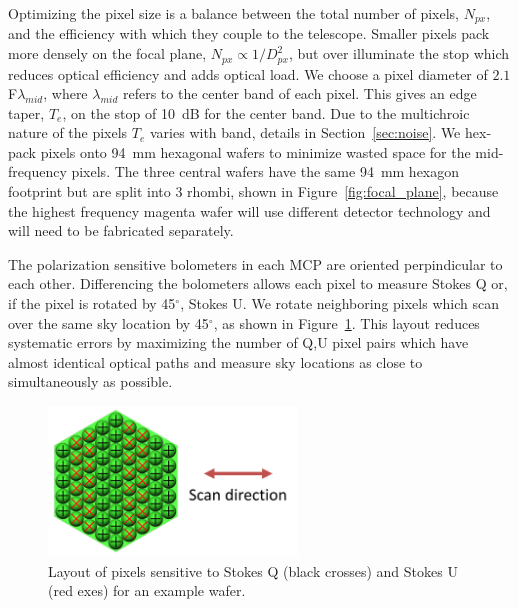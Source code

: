 \documentclass[]{spie}  %
\newcommand{\comr}[1]{\textcolor{red}{#1}}
\newcommand{\dgr}{$^\circ$}
\begin{document}
Optimizing the pixel size is a balance between the total number of pixels, $N_{px}$, and the efficiency with which they couple to the telescope. 
Smaller pixels pack more densely on the focal plane, $N_{px}\propto 1/D_{px}^2$, but over illuminate the stop which reduces optical efficiency 
and adds optical load.  
We choose a pixel diameter of $2.1$F$\lambda_{mid}$, where $\lambda_{mid}$ refers to the center 
band of each pixel. This gives an edge taper, $T_e$, on the stop of 10~dB for the center band. 
Due to the multichroic nature of the pixels $T_e$ varies with band, details in Section~\ref{sec:noise}. 
We hex-pack pixels onto 94~mm hexagonal wafers to minimize wasted space for the mid-frequency pixels. 
The three central wafers have the same 94~mm hexagon footprint but are split into 
3 rhombi, shown in Figure~\ref{fig:focal_plane}, because the highest frequency magenta wafer will use different 
detector technology and will need to be fabricated separately.  

The polarization sensitive bolometers in each MCP are oriented perpindicular to each other. Differencing the bolometers allows each pixel to measure Stokes Q or, if the 
pixel is rotated by 45\dgr, Stokes U. We rotate neighboring pixels which scan over the same sky location by 45\dgr, as shown in Figure~\ref{fig:QU}.
This layout reduces systematic errors by maximizing the number of Q,U pixel pairs which have almost identical optical paths and measure sky locations 
as close to simultaneously as possible.  %

\begin{figure} [ht]
\begin{center}
\includegraphics[height=4cm]{QU_wafer.png}
\end{center}
\caption { \label{fig:QU} 
Layout of pixels sensitive to Stokes Q (black crosses) and Stokes U (red exes) for an example wafer.}
\end{figure}
\end{document}
